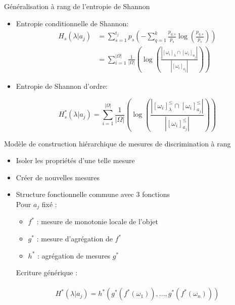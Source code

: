 \documentclass[usenames,dvipsnames]{beamer}
\newcommand{\beamcite}[1]{\hfill {\footnotesize \textcite{#1}}}
\newcommand{\myfrac}[2]{\frac{\displaystyle {#1}}{\displaystyle {#2}}}
\begin{document}
\begin{frame}{Généralisation à rang de l'entropie de Shannon \beamcite{hu-information}}
\begin{itemize}
\item Entropie conditionnelle de Shannon: 
    \begin{align*}
        H_s\left(\lambda | a_j\right) &= \sum_{s=1}^{t_j}p_s\left(-\sum_{q=1}^{k}\myfrac{p_{q,s}}{p_s}\log\left(\myfrac{p_{q,s}}{p_s}\right)\right)\\
            &= \sum_{i=1}^{|\Omega|} \frac{1}{|\Omega|}\left(\log \left(\frac{|[\omega_i]_{\lambda} \cap [\omega_i]_{a_j}|}{|[\omega_i]_{a_j}|}\right)\right)
    \end{align*}
\item Entropie de Shannon d'ordre: 

    $$H^*_s\left(\lambda | a_j\right) = \sum_{i=1}^{|\Omega|} \frac{1}{|\Omega|}\left(\log \left(\frac{|[\omega_i]^{\leq}_{\lambda} \cap [\omega_i]^{\leq}_{a_j}|}{|[\omega_i]^{\leq}_{a_j}|}\right)\right)$$

\end{itemize}

\end{frame}

\begin{frame}{Modèle de construction hiérarchique de mesures de discrimination à rang \beamcite{marsala-rank}}
\begin{itemize}
\item Isoler les propriétés d'une telle mesure
\item Créer de nouvelles mesures
\item Structure fonctionnelle commune avec 3 fonctions \\
Pour $a_j$ fixé :
\begin{itemize}
\item $f^*$ : mesure de monotonie locale de l'objet
\item $g^*$ : mesure d'agrégation de $f^*$
\item $h^*$ : agrégation de mesures $g^*$
\end{itemize}
Ecriture générique : \\~\
            $$H^*(\lambda | a_j) = h^*(g^*(f^*(\omega_1)),...,g^*(f^*(\omega_n)))$$
\end{itemize}
\end{frame}
\end{document}
